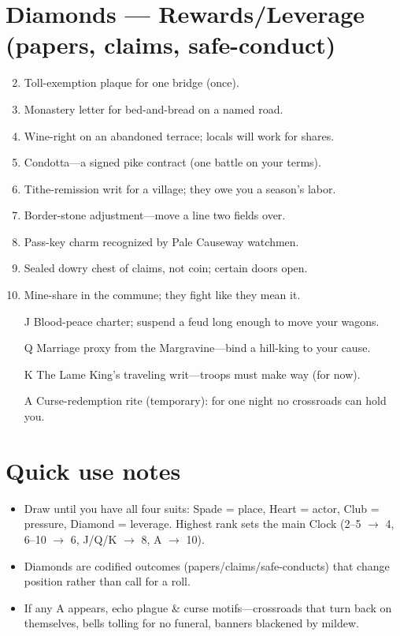 \section*{Diamonds --- Rewards/Leverage (papers, claims, safe-conduct)}
\label{sec:acasia-rewards}
\begin{enumerate}
\setcounter{enumi}{1}
\item Toll-exemption plaque for one bridge (once).
\item Monastery letter for bed-and-bread on a named road.
\item Wine-right on an abandoned terrace; locals will work for shares.
\item Condotta---a signed pike contract (one battle on your terms).
\item Tithe-remission writ for a village; they owe you a season's labor.
\item Border-stone adjustment---move a line two fields over.
\item Pass-key charm recognized by Pale Causeway watchmen.
\item Sealed dowry chest of claims, not coin; certain doors open.
\item Mine-share in the commune; they fight like they mean it.
\item[J] Blood-peace charter; suspend a feud long enough to move your wagons.
\item[Q] Marriage proxy from the Margravine---bind a hill-king to your cause.
\item[K] The Lame King's traveling writ---troops must make way (for now).
\item[A] Curse-redemption rite (temporary): for one night no crossroads can hold you.
\end{enumerate}

\section*{Quick use notes}
\label{sec:acasia-quick-use}
\begin{itemize}
\item Draw until you have all four suits: Spade = place, Heart = actor, Club = pressure, Diamond = leverage. Highest rank sets the main Clock (2--5 $\rightarrow$ 4, 6--10 $\rightarrow$ 6, J/Q/K $\rightarrow$ 8, A $\rightarrow$ 10).
\item Diamonds are codified outcomes (papers/claims/safe-conducts) that change position rather than call for a roll.
\item If any A appears, echo plague \& curse motifs---crossroads that turn back on themselves, bells tolling for no funeral, banners blackened by mildew.
\end{itemize}

